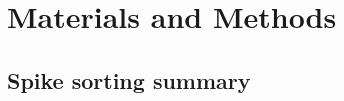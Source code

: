 \documentclass{article}
\begin{document}






\section{Materials and Methods}
\label{sec:headings}


\subsection{Spike sorting summary}
\label{methods:spike_sorting}
\end{document}
